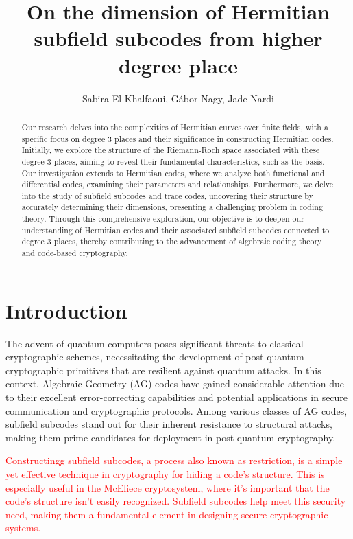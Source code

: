 \documentclass[a4paper]{amsart}
\title{On the dimension of Hermitian subfield subcodes from higher degree place}
\author{Sabira El Khalfaoui, G\'abor Nagy, Jade Nardi}
\date{}
\theoremstyle{plain}
\theoremstyle{definition}
\theoremstyle{remark}
\begin{document}
\begin{abstract}
Our research delves into the complexities of Hermitian curves over finite fields, with a specific focus on degree 3 places and their significance in constructing Hermitian codes. Initially, we explore the structure of the Riemann-Roch space associated with these degree 3 places, aiming to reveal their fundamental characteristics, such as the basis. Our investigation extends to Hermitian codes, where we analyze both functional and differential codes, examining their parameters and relationships. Furthermore, we delve into the study of subfield subcodes and trace codes, uncovering their structure by accurately determining their dimensions, presenting a challenging problem in coding theory. Through this comprehensive exploration, our objective is to deepen our understanding of Hermitian codes and their associated subfield subcodes connected to degree 3 places, thereby contributing to the advancement of algebraic coding theory and code-based cryptography.
\end{abstract}


\maketitle

\section{Introduction}

The advent of quantum computers poses significant threats to classical cryptographic schemes, necessitating the development of post-quantum cryptographic primitives that are resilient against quantum attacks. In this context, Algebraic-Geometry (AG) codes have gained considerable attention due to their excellent error-correcting capabilities and potential applications in secure communication and cryptographic protocols. Among various classes of AG codes, subfield subcodes stand out for their inherent resistance to structural attacks, making them prime candidates for deployment in post-quantum cryptography.


\textcolor{red}{Constructingg subfield subcodes, a process also known as restriction, is a simple yet effective technique in cryptography for hiding a code's structure. This is especially useful in the McEliece cryptosystem, where it's important that the code's structure isn't easily recognized. Subfield subcodes help meet this security need, making them a fundamental element in designing secure cryptographic systems.}
\end{document}
